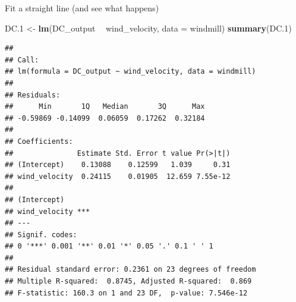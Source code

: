 \documentclass[ignorenonframetext,]{beamer}
\newenvironment{Shaded}{\begin{snugshade}}{\end{snugshade}}
\newcommand{\DataTypeTok}[1]{\textcolor[rgb]{0.13,0.29,0.53}{#1}}
\newcommand{\FloatTok}[1]{\textcolor[rgb]{0.00,0.00,0.81}{#1}}
\newcommand{\KeywordTok}[1]{\textcolor[rgb]{0.13,0.29,0.53}{\textbf{#1}}}
\newcommand{\NormalTok}[1]{#1}
\newcommand{\OperatorTok}[1]{\textcolor[rgb]{0.81,0.36,0.00}{\textbf{#1}}}
\newcommand{\StringTok}[1]{\textcolor[rgb]{0.31,0.60,0.02}{#1}}
\begin{document}
\begin{frame}[fragile]{Fit a straight line (and see what happens)}
\protect\hypertarget{fit-a-straight-line-and-see-what-happens}{}

\begin{Shaded}
\begin{Highlighting}[]
\NormalTok{DC}\FloatTok{.1}\NormalTok{ <-}\StringTok{ }\KeywordTok{lm}\NormalTok{(DC_output }\OperatorTok{~}\StringTok{ }\NormalTok{wind_velocity, }\DataTypeTok{data =}\NormalTok{ windmill)}
\KeywordTok{summary}\NormalTok{(DC}\FloatTok{.1}\NormalTok{)}
\end{Highlighting}
\end{Shaded}

\begin{verbatim}
## 
## Call:
## lm(formula = DC_output ~ wind_velocity, data = windmill)
## 
## Residuals:
##      Min       1Q   Median       3Q      Max 
## -0.59869 -0.14099  0.06059  0.17262  0.32184 
## 
## Coefficients:
##               Estimate Std. Error t value Pr(>|t|)
## (Intercept)    0.13088    0.12599   1.039     0.31
## wind_velocity  0.24115    0.01905  12.659 7.55e-12
##                  
## (Intercept)      
## wind_velocity ***
## ---
## Signif. codes:  
## 0 '***' 0.001 '**' 0.01 '*' 0.05 '.' 0.1 ' ' 1
## 
## Residual standard error: 0.2361 on 23 degrees of freedom
## Multiple R-squared:  0.8745, Adjusted R-squared:  0.869 
## F-statistic: 160.3 on 1 and 23 DF,  p-value: 7.546e-12
\end{verbatim}

\end{frame}
\end{document}
